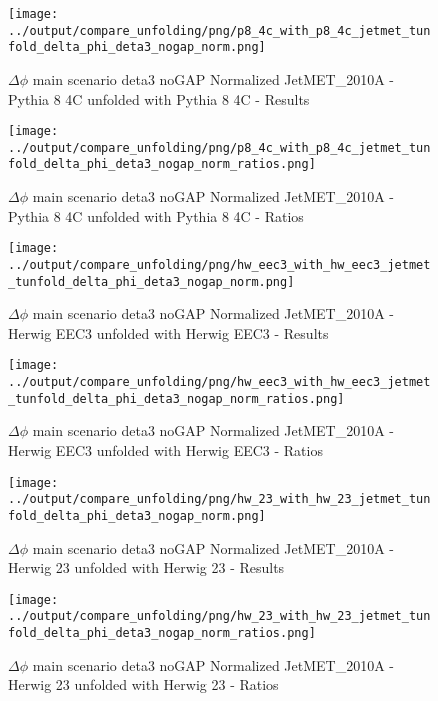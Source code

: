 \documentclass[11pt]{book}
\begin{document}
\begin{figure}[ht]
\centering
\texttt{[image: ../output/compare\_unfolding/png/p8\_4c\_with\_p8\_4c\_jetmet\_tunfold\_delta\_phi\_deta3\_nogap\_norm.png]}
\caption{$\Delta\phi$ main scenario deta3 noGAP Normalized JetMET\_2010A - Pythia 8 4C unfolded with Pythia 8 4C - Results}
\label{p8_p8_jetmet_tunfold_delta_phi_deta3_nogap_norm_a}
\end{figure}

\begin{figure}[ht]
\centering
\texttt{[image: ../output/compare\_unfolding/png/p8\_4c\_with\_p8\_4c\_jetmet\_tunfold\_delta\_phi\_deta3\_nogap\_norm\_ratios.png]}
\caption{$\Delta\phi$ main scenario deta3 noGAP Normalized JetMET\_2010A - Pythia 8 4C unfolded with Pythia 8 4C - Ratios}
\label{p8_p8_jetmet_tunfold_delta_phi_deta3_nogap_norm_b}
\end{figure}

\begin{figure}[ht]
\centering
\texttt{[image: ../output/compare\_unfolding/png/hw\_eec3\_with\_hw\_eec3\_jetmet\_tunfold\_delta\_phi\_deta3\_nogap\_norm.png]}
\caption{$\Delta\phi$ main scenario deta3 noGAP Normalized JetMET\_2010A - Herwig EEC3 unfolded with Herwig EEC3 - Results}
\label{hw_eec3_hw_eec3_jetmet_tunfold_delta_phi_deta3_nogap_norm_a}
\end{figure}

\begin{figure}[ht]
\centering
\texttt{[image: ../output/compare\_unfolding/png/hw\_eec3\_with\_hw\_eec3\_jetmet\_tunfold\_delta\_phi\_deta3\_nogap\_norm\_ratios.png]}
\caption{$\Delta\phi$ main scenario deta3 noGAP Normalized JetMET\_2010A - Herwig EEC3 unfolded with Herwig EEC3 - Ratios}
\label{hw_eec3_hw_eec3_jetmet_tunfold_delta_phi_deta3_nogap_norm_b}
\end{figure}

\begin{figure}[ht]
\centering
\texttt{[image: ../output/compare\_unfolding/png/hw\_23\_with\_hw\_23\_jetmet\_tunfold\_delta\_phi\_deta3\_nogap\_norm.png]}
\caption{$\Delta\phi$ main scenario deta3 noGAP Normalized JetMET\_2010A - Herwig 23 unfolded with Herwig 23 - Results}
\label{hw_23_hw_23_jetmet_tunfold_delta_phi_deta3_nogap_norm_a}
\end{figure}

\begin{figure}[ht]
\centering
\texttt{[image: ../output/compare\_unfolding/png/hw\_23\_with\_hw\_23\_jetmet\_tunfold\_delta\_phi\_deta3\_nogap\_norm\_ratios.png]}
\caption{$\Delta\phi$ main scenario deta3 noGAP Normalized JetMET\_2010A - Herwig 23 unfolded with Herwig 23 - Ratios}
\label{hw_23_hw_23_jetmet_tunfold_delta_phi_deta3_nogap_norm_b}
\end{figure}
\end{document}
